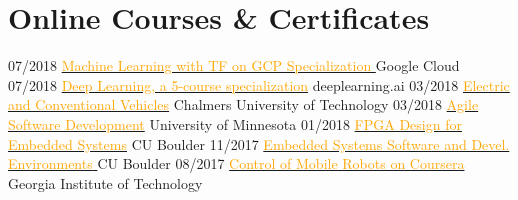 \documentclass[]{friggeri-cv}
\begin{document}
\section{Online Courses \& Certificates}
\begin{entrylist}
\entry
    {07/2018}
    {\href{https://www.coursera.org/verify/specialization/PLESFRLGX57Y}{\textcolor{orange}{Machine Learning with TF on GCP Specialization }} }
    { Google Cloud }
    {\emph{}}
\entry
    {07/2018}
    {\href{https://www.coursera.org/account/accomplishments/specialization/certificate/X8GDFN8YHAU6}{\textcolor{orange}{Deep Learning, a 5-course specialization}} }
    { deeplearning.ai }
    {\emph{}}
 \entry
    {03/2018}
    {\href{https://courses.edx.org/certificates/3d94e47ded1e49649d358c7d8fd12989}{\textcolor{orange}{Electric and Conventional Vehicles}} }
    { Chalmers University of Technology }
    {\emph{}}
   \entry
    {03/2018}
    {\href{https://www.coursera.org/account/accomplishments/certificate/3V9G5VAVE93F}{\textcolor{orange}{Agile Software Development}} }
    {University of Minnesota}
    {\emph{}}
  \entry
    {01/2018}
    {\href{https://www.coursera.org/account/accomplishments/certificate/G5QLQYHBYCJR}{\textcolor{orange}{FPGA Design for Embedded Systems}} }
    {CU Boulder}
    {\emph{}}
  \entry
    {11/2017}
    {\href{https://www.coursera.org/account/accomplishments/verify/U4HKE8MNY33F}{\textcolor{orange}{Embedded Systems Software and Devel. Environments} }}
    {CU Boulder}
    {\emph{}}
    \entry
    {08/2017}
    {\href{https://www.coursera.org/account/accomplishments/verify/J6YH5LSNL4CF}{\textcolor{orange}{Control of Mobile Robots on Coursera}} }
    {Georgia Institute of Technology}
    {\emph{}}
  
   \end{entrylist}
\end{document}
